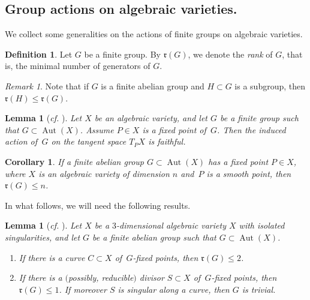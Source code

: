 \documentclass[11pt]{amsart}
\numberwithin{equation}{section}
\newtheorem{corollary}[thm]{Corollary}
\newtheorem{lem}[thm]{Lemma}
\theoremstyle{definition}
\newtheorem{defin}[thm]{Definition}
\theoremstyle{remark}
\newtheorem{remark}[thm]{Remark}
\DeclareMathOperator{\Aut}{Aut}
\begin{document}
\subsection{Group actions on algebraic varieties.}
We collect some generalities on the actions of finite groups on algebraic varieties. 

\begin{defin}
Let $G$ be a finite group. By $\mathfrak{r}(G)$, we denote the \emph{rank} of $G$, that is, the minimal number of generators of $G$.
\end{defin}

\begin{remark}
\label{rem-rank-subgroup}
Note that if $G$ is a finite abelian group and $H\subset G$ is a subgroup, then $\mathfrak{r}(H)\leq \mathfrak{r}(G)$. 
\end{remark}

\begin{lem}[\textit{cf.} {\cite[Lemma 4]{Po14}}]
\label{lem-faithful-action}
Let $X$ be an algebraic variety, and let $G$ be a finite group such that $G\subset \Aut(X)$. Assume $P\in X$ is a fixed point of\, $G$.  Then the induced action of\, $G$ on the tangent space $T_P X$ is faithful.
\end{lem}

\begin{corollary}
\label{cor-faithful-action}
If a finite abelian group $G\subset \Aut(X)$ has a fixed point $P\in X$, where $X$ is an algebraic variety of dimension $n$ and~$P$ is a smooth point, then $\mathfrak{r}(G)\leq n$.
\end{corollary}

In what follows, we will need the following results. 

\begin{lem}[\textit{cf.} {\cite[Lemma 2.6]{Pr11}}]
\label{lem-fixed-curve-surface}
Let $X$ be a $3$-dimensional algebraic variety $X$ with isolated singularities, and let $G$ be a finite abelian group such that $G\subset \Aut(X)$.
\begin{enumerate}
\item\label{lfcs-1} 
If there is a curve $C\subset X$ of\, $G$-fixed points, then $\mathfrak{r}(G) \leq 2$.
\item\label{lfcs-2} 
If there is a $($possibly, reducible$)$ divisor $S\subset X$ of\, $G$-fixed points, then $\mathfrak{r}(G)\leq 1$.  If moreover $S$ is singular along a curve, then $G$ is trivial.
\end{enumerate}
\end{lem}
\end{document}
